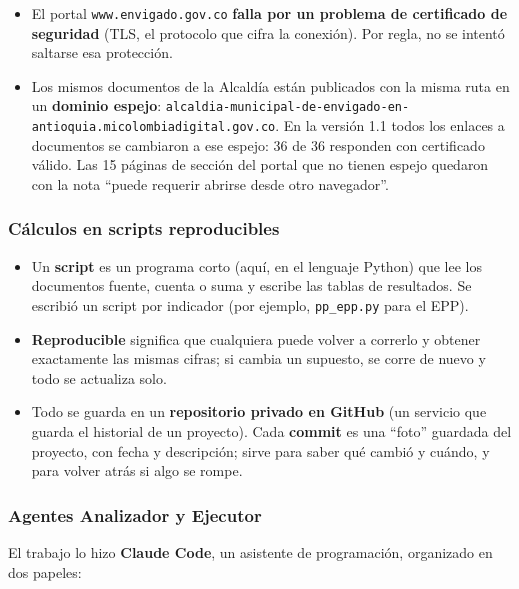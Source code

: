 \documentclass[11pt,letterpaper]{article}
\begin{document}
\begin{itemize}
\item El portal \texttt{\footnotesize www.\allowbreak{}envigado.\allowbreak{}gov.\allowbreak{}co} \textbf{falla por un problema de certificado de seguridad} (TLS, el protocolo que cifra la conexión). Por regla, no se intentó saltarse esa protección.
\item Los mismos documentos de la Alcaldía están publicados con la misma ruta en un \textbf{dominio espejo}: \texttt{\footnotesize alcaldia-\allowbreak{}municipal-\allowbreak{}de-\allowbreak{}envigado-\allowbreak{}en-\allowbreak{}antioquia.\allowbreak{}micolombiadi\allowbreak{}gital.\allowbreak{}gov.\allowbreak{}co}. En la versión 1.1 todos los enlaces a documentos se cambiaron a ese espejo: 36 de 36 responden con certificado válido. Las 15 páginas de sección del portal que no tienen espejo quedaron con la nota ``puede requerir abrirse desde otro navegador''.
\end{itemize}

\subsubsection*{Cálculos en scripts reproducibles}

\begin{itemize}
\item Un \textbf{script} es un programa corto (aquí, en el lenguaje Python) que lee los documentos fuente, cuenta o suma y escribe las tablas de resultados. Se escribió un script por indicador (por ejemplo, \texttt{\footnotesize pp\_\allowbreak{}epp.\allowbreak{}py} para el EPP).
\item \textbf{Reproducible} significa que cualquiera puede volver a correrlo y obtener exactamente las mismas cifras; si cambia un supuesto, se corre de nuevo y todo se actualiza solo.
\item Todo se guarda en un \textbf{repositorio privado en GitHub} (un servicio que guarda el historial de un proyecto). Cada \textbf{commit} es una ``foto'' guardada del proyecto, con fecha y descripción; sirve para saber qué cambió y cuándo, y para volver atrás si algo se rompe.
\end{itemize}

\subsubsection*{Agentes Analizador y Ejecutor}

El trabajo lo hizo \textbf{Claude Code}, un asistente de programación, organizado en dos papeles:
\end{document}
